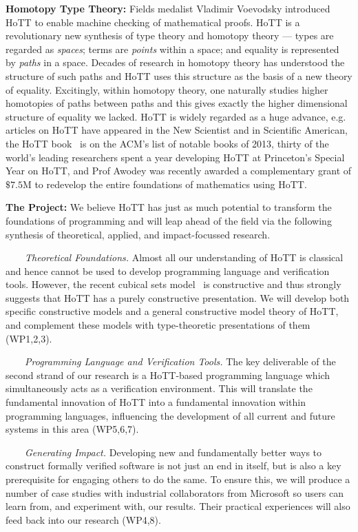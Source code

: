 \documentclass[a4paper,11pt]{article}
\newcommand{\eg}{{e.g.}\ }
\begin{document}
{\bf Homotopy Type Theory:} %
Fields medalist
Vladimir Voevodsky introduced HoTT to enable machine checking of
mathematical proofs.  HoTT is 
a revolutionary new synthesis of type theory and homotopy
theory --- types are regarded as \emph{spaces}; terms are
\emph{points} within a space; and equality is represented by
\emph{paths} in a space. Decades of research in homotopy theory has
understood the structure of such paths and HoTT uses this structure as
the basis of a new theory of equality. Excitingly,
within homotopy theory, one naturally studies higher homotopies of
paths between paths and this gives exactly the %
higher dimensional structure of equality we lacked. %
HoTT is widely regarded as a huge advance, \eg
articles on HoTT have appeared in the New Scientist and in Scientific
American, the HoTT book~\cite{hott-book} is on the ACM's list
of notable books of 2013, thirty of the world's leading researchers
spent a year developing HoTT at Princeton's Special Year on HoTT, and
Prof Awodey was recently awarded a complementary grant of $\$ 7.5$M to
redevelop the entire foundations of mathematics using HoTT.


{\bf The Project:} We believe HoTT has just as much potential to
transform the foundations of programming and will leap
ahead of the field via the following
synthesis of theoretical, applied, and impact-focussed research.

$\;\;\; \;\;\;$ {\em Theoretical Foundations.} 
Almost all our understanding of HoTT is classical and hence
cannot be used to develop programming language and verification
tools. However, the recent cubical sets model~\cite{BezemM:cubsmt,nominal} is constructive and
thus strongly suggests that HoTT has a purely constructive
presentation. We will develop both specific constructive models and a
general constructive model theory of HoTT, and complement these models
with type-theoretic presentations of them (WP1,2,3).

$\;\;\;\;\;\;$ {\em Programming Language and Verification Tools.} The key
  deliverable of the second strand of our research is a HoTT-based
  programming language which simultaneously acts as a verification
  environment. This will translate the fundamental innovation of HoTT
  into a fundamental innovation within programming languages,
  influencing the development of all current and future systems in
  this area (WP5,6,7).

  $\;\;\;\;\;\;$ {\em Generating Impact.} Developing new and
  fundamentally better ways to construct formally verified software is
  not just an end in itself, but is also a key prerequisite for
  engaging others to do the same.  To ensure this, we will produce a
  number of case studies with industrial collaborators from Microsoft so users can
  learn from, and experiment with, our results. Their practical
  experiences will also feed back into our research (WP4,8).
\end{document}
